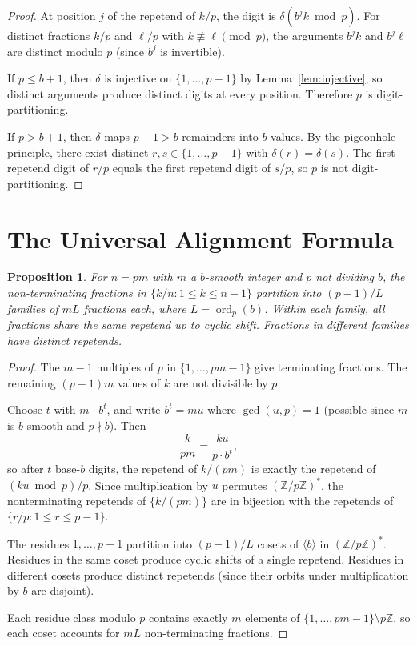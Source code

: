 \documentclass[12pt]{amsart}
\newtheorem{proposition}[theorem]{Proposition}
\theoremstyle{definition}
\theoremstyle{remark}
\begin{document}
\begin{proof}
At position $j$ of the repetend of $k/p$, the digit is
$\delta(b^{j}k \bmod p)$. For distinct fractions $k/p$
and $\ell/p$ with $k \not\equiv \ell \pmod{p}$, the
arguments $b^{j}k$ and $b^{j}\ell$ are distinct modulo $p$
(since $b^{j}$ is invertible).

If $p \le b + 1$, then $\delta$ is injective on
$\{1, \ldots, p{-}1\}$ by Lemma~\ref{lem:injective}, so
distinct arguments produce distinct digits at every
position. Therefore $p$ is digit-partitioning.

If $p > b + 1$, then $\delta$ maps $p - 1 > b$ remainders
into $b$ values. By the pigeonhole principle, there exist
distinct $r, s \in \{1, \ldots, p{-}1\}$ with
$\delta(r) = \delta(s)$. The first repetend digit of
$r/p$ equals the first repetend digit of $s/p$, so $p$ is
not digit-partitioning.
\end{proof}

\section{The Universal Alignment Formula}

\begin{proposition}\label{lem:cycle-partition}
For $n = pm$ with $m$ a $b$-smooth integer and $p$ not dividing $b$,
the non-terminating fractions in $\{k/n : 1 \le k \le n{-}1\}$
partition into $(p{-}1)/L$ families of $mL$ fractions each,
where $L = \operatorname{ord}_{p}(b)$. Within each family, all
fractions share the same repetend up to cyclic shift. Fractions in
different families have distinct repetends.
\end{proposition}

\begin{proof}
The $m - 1$ multiples of $p$ in $\{1, \ldots, pm{-}1\}$ give
terminating fractions. The remaining $(p{-}1)m$ values of $k$ are
not divisible by $p$.

Choose $t$ with $m \mid b^{t}$, and write $b^{t} = mu$
where $\gcd(u, p) = 1$ (possible since $m$ is $b$-smooth
and $p \nmid b$). Then
\[
\frac{k}{pm} = \frac{ku}{p \cdot b^{t}},
\]
so after $t$ base-$b$ digits, the repetend of $k/(pm)$
is exactly the repetend of $(ku \bmod p)/p$.
Since multiplication by $u$ permutes
$(\mathbb{Z}/p\mathbb{Z})^{*}$, the nonterminating
repetends of $\{k/(pm)\}$ are in bijection with
the repetends of $\{r/p : 1 \le r \le p{-}1\}$.

The residues $1, \ldots, p{-}1$ partition into
$(p{-}1)/L$ cosets of $\langle b \rangle$ in
$(\mathbb{Z}/p\mathbb{Z})^{*}$. Residues in the
same coset produce cyclic shifts of a single
repetend. Residues in different cosets produce
distinct repetends (since their orbits under
multiplication by $b$ are disjoint).

Each residue class modulo $p$ contains exactly $m$ elements of
$\{1, \ldots, pm{-}1\} \setminus p\mathbb{Z}$, so each coset
accounts for $mL$ non-terminating fractions.
\end{proof}
\end{document}
